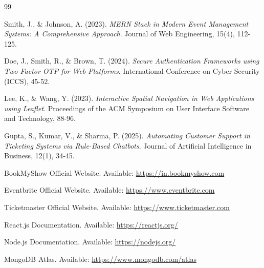 \documentclass[12pt]{report}
\let\cleardoublepage\clearpage
\begin{document}
\renewcommand{\bibname}{References}
\cleardoublepage
{}
\begin{thebibliography}{99}

Smith, J., \& Johnson, A. (2023). 
\textit{MERN Stack in Modern Event Management Systems: A Comprehensive Approach}. 
Journal of Web Engineering, 15(4), 112-125.

Doe, J., Smith, R., \& Brown, T. (2024). 
\textit{Secure Authentication Frameworks using Two-Factor OTP for Web Platforms}. 
International Conference on Cyber Security (ICCS), 45-52.

Lee, K., \& Wang, Y. (2023). 
\textit{Interactive Spatial Navigation in Web Applications using Leaflet}. 
Proceedings of the ACM Symposium on User Interface Software and Technology, 88-96.

Gupta, S., Kumar, V., \& Sharma, P. (2025). 
\textit{Automating Customer Support in Ticketing Systems via Rule-Based Chatbots}. 
Journal of Artificial Intelligence in Business, 12(1), 34-45.

BookMyShow Official Website. Available: \url{https://in.bookmyshow.com}

Eventbrite Official Website. Available: \url{https://www.eventbrite.com}

Ticketmaster Official Website. Available: \url{https://www.ticketmaster.com}

React.js Documentation. Available: \url{https://reactjs.org/}

Node.js Documentation. Available: \url{https://nodejs.org/}

MongoDB Atlas. Available: \url{https://www.mongodb.com/atlas}

\end{thebibliography}
\end{document}
